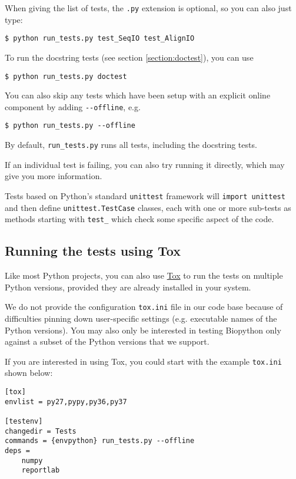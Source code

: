 When giving the list of tests, the \verb|.py| extension is optional,
so you can also just type:

\begin{verbatim}
$ python run_tests.py test_SeqIO test_AlignIO
\end{verbatim}

To run the docstring tests (see section \ref{section:doctest}), you can use

\begin{verbatim}
$ python run_tests.py doctest
\end{verbatim}

You can also skip any tests which have been setup with an explicit
online component by adding \verb|--offline|, e.g.

\begin{verbatim}
$ python run_tests.py --offline
\end{verbatim}

By default, \verb|run_tests.py| runs all tests, including the docstring tests.

If an individual test is failing, you can also try running it
directly, which may give you more information.

Tests based on Python's standard  \verb|unittest| framework will
\verb|import unittest| and then define \verb|unittest.TestCase| classes,
each with one or more sub-tests as methods starting with \verb|test_| which
check some specific aspect of the code.

\subsection{Running the tests using Tox}

Like most Python projects, you can also use
\href{https://tox.readthedocs.org/en/latest/}{Tox} to run the tests on multiple
Python versions, provided they are already installed in your system.

We do not provide the configuration \texttt{tox.ini} file in our code base because
of difficulties pinning down user-specific settings (e.g. executable names of the
Python versions). You may also only be interested in testing Biopython only against
a subset of the Python versions that we support.

If you are interested in using Tox, you could start with the example
\texttt{tox.ini} shown below:

\begin{verbatim}
[tox]
envlist = py27,pypy,py36,py37

[testenv]
changedir = Tests
commands = {envpython} run_tests.py --offline
deps =
    numpy
    reportlab
\end{verbatim}

